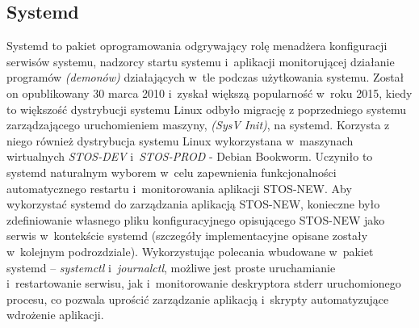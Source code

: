 \subsection{Systemd}
Systemd to pakiet oprogramowania odgrywający rolę menadżera konfiguracji serwisów systemu, nadzorcy startu systemu i~aplikacji monitorującej działanie programów \textit{(demonów)} działających w~tle podczas użytkowania systemu\cite{systemd}. Został on opublikowany 30 marca 2010 i~zyskał większą popularność w~roku 2015, kiedy to większość dystrybucji systemu Linux odbyło migrację z poprzedniego systemu zarządzającego uruchomieniem maszyny, \textit{(SysV Init)}, na systemd. Korzysta z niego również dystrybucja systemu Linux wykorzystana w~maszynach wirtualnych \textit{STOS-DEV} i~\textit{STOS-PROD} - Debian Bookworm. Uczyniło to systemd naturalnym wyborem w~celu zapewnienia funkcjonalności automatycznego restartu i~monitorowania aplikacji STOS-NEW. 
\newline \noindent Aby wykorzystać systemd do zarządzania aplikacją STOS-NEW, konieczne było zdefiniowanie własnego pliku konfiguracyjnego opisującego STOS-NEW jako serwis w~kontekście systemd (szczegóły implementacyjne opisane zostały w~kolejnym podrozdziale)\cite{systemd-service}. Wykorzystując polecania wbudowane w~pakiet systemd -- \textit{systemctl} i~\textit{journalctl}, możliwe jest proste uruchamianie i~restartowanie serwisu, jak i~monitorowanie deskryptora stderr uruchomionego procesu, co pozwala uprościć zarządzanie aplikacją i~skrypty automatyzujące wdrożenie aplikacji.
